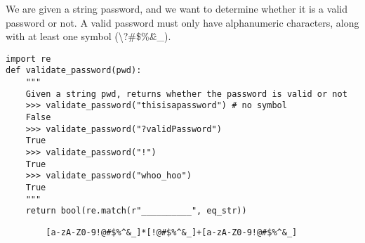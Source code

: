 \begin{blocksection}
\question We are given a string password, and we want to determine whether it is a valid password or not. 
A valid password must only have alphanumeric characters, along with at least one symbol 
(\textbackslash?\#\$\%\^\&\*\!\_).

\begin{lstlisting}
import re
def validate_password(pwd):
    """
    Given a string pwd, returns whether the password is valid or not
    >>> validate_password("thisisapassword") # no symbol
    False
    >>> validate_password("?validPassword")
    True
    >>> validate_password("!")
    True
    >>> validate_password("whoo_hoo")
    True
    """
    return bool(re.match(r"__________", eq_str))
\end{lstlisting}

\begin{solution}[2in]
    \begin{lstlisting}
        [a-zA-Z0-9!@#$%^&_]*[!@#$%^&_]+[a-zA-Z0-9!@#$%^&_]
    \end{lstlisting}
\end{solution}
\end{blocksection}
